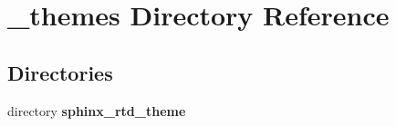 \section{\-\_\-themes Directory Reference}
\label{dir_a9f33413c89d2b3f212613191fd4f56c}
\subsection*{Directories}
\begin{DoxyCompactItemize}
\item 
directory {\bf sphinx\-\_\-rtd\-\_\-theme}
\end{DoxyCompactItemize}
